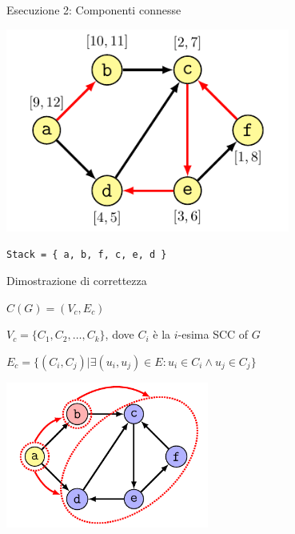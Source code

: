 \begin{frame}{Esecuzione 2: Componenti connesse}

\centering\includegraphics[width=0.7\textwidth,page=4]{scc4.pdf}

\Large
\texttt{Stack = \{ a, b, f, c, e, d \} }

\end{frame}



\begin{frame}{Dimostrazione di correttezza}

\vspace{-9pt}
\begin{myboxtitle}
$C(G) = (V_c, E_c)$
\BI
\item $V_c = \{ C_1, C_2, \ldots , C_k \}$, dove $C_i$ è la $i$-esima SCC of $G$
\item $E_c = \{ (C_i, C_j) | \exists (u_i, u_j) \in E: u_i \in C_i \wedge u_j \in C_j \}$
\EI
\end{myboxtitle}

\centering\includegraphics[width=0.5\textwidth,page=1]{scc2.pdf}
\end{frame}

